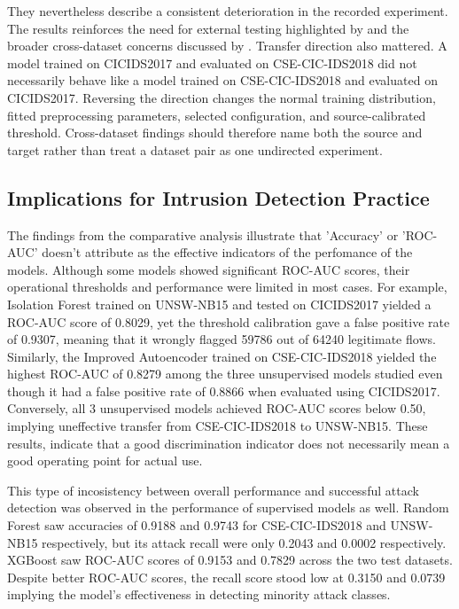 They nevertheless describe a consistent deterioration in the recorded experiment. The results reinforces the need for external testing highlighted 
by \cite{Verkerken2022} and the broader cross-dataset concerns discussed by \cite{Cantone2024}. Transfer direction also mattered. A model trained 
on CICIDS2017 and evaluated on CSE-CIC-IDS2018 did not necessarily behave like a model trained on CSE-CIC-IDS2018 and evaluated on CICIDS2017. 
Reversing the direction changes the normal training distribution, fitted preprocessing parameters, selected configuration, and source-calibrated 
threshold. Cross-dataset findings should therefore name both the source and target rather than treat a dataset pair as one undirected experiment.

\subsection*{Implications for Intrusion Detection Practice}

The findings from the comparative analysis illustrate that 'Accuracy' or 'ROC-AUC' doesn't attribute as the effective indicators of the perfomance of 
the models. Although some models showed significant ROC-AUC scores, their operational thresholds and performance were limited in most cases. For example, 
Isolation Forest trained on UNSW-NB15 and tested on CICIDS2017 yielded a ROC-AUC score of 0.8029, yet the threshold calibration gave a false positive rate 
of 0.9307, meaning that it wrongly flagged 59786 out of 64240 legitimate flows. Similarly, the Improved Autoencoder trained on CSE-CIC-IDS2018 yielded the 
highest ROC-AUC of 0.8279 among the three unsupervised models studied even though it had a false positive rate of 0.8866 when evaluated using CICIDS2017. Conversely,
all 3 unsupervised models achieved ROC-AUC scores below 0.50, implying uneffective transfer from CSE-CIC-IDS2018 to UNSW-NB15. These results, indicate that a good 
discrimination indicator does not necessarily mean a good operating point for actual use.

This type of incosistency between overall performance and successful attack detection was observed in the performance of supervised models as well.  Random Forest saw 
accuracies of 0.9188 and 0.9743 for CSE-CIC-IDS2018 and UNSW-NB15 respectively, but its attack recall were only 0.2043 and 0.0002 respectively. XGBoost saw ROC-AUC scores 
of 0.9153 and 0.7829 across the two test datasets. Despite better 
ROC-AUC scores, the recall score stood low at 0.3150 and 0.0739 implying the model's effectiveness in detecting minority attack classes.

